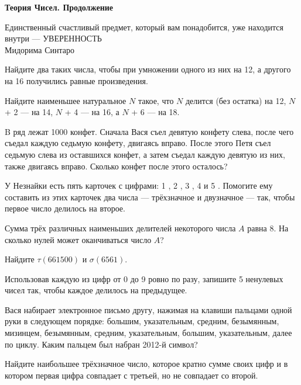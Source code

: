 \centerline{\bf \Huge Теория Чисел. Продолжение}

\begin{flushright}
        \scriptsize{Единственный счастливый предмет, который вам понадобится, уже находится внутри — УВЕРЕННОСТЬ\\ Мидорима Синтаро}
\end{flushright}

 Найдите два таких числа, чтобы при умножении одного из них на 12, а другого на 16 получились равные произведения.

 Найдите наименьшее натуральное $N$
такое, что $N$ делится (без остатка) на 12, $N$ + 2 — на 14, $N$ + 4 — на 16, а $N$ + 6 — на 18.

 B ряд лежат 1000 конфет. Сначала Вася съел
девятую конфету слева, после чего съедал каждую седьмую конфету, двигаясь вправо. После
этого Петя съел седьмую слева из оставшихся конфет, а затем съедал каждую девятую из них,
также двигаясь вправо. Сколько конфет после этого осталось?

 У Незнайки есть пять карточек с цифрами: 1 , 2 ,
3 , 4 и 5 . Помогите ему составить из этих карточек два числа — трёхзначное и двузначное —
так, чтобы первое число делилось на второе.

  Сумма трёх различных наименьших делителей
некоторого числа $A$ равна 8. На сколько нулей может оканчиваться число $A$?

 Найдите $\tau(661500)$ и $\sigma(6561). $

 Использовав каждую из цифр от 0 до 9 ровно по
разу, запишите 5 ненулевых чисел так, чтобы каждое делилось на предыдущее.

 Вася набирает электронное письмо другу, нажимая на клавиши
пальцами одной руки в следующем порядке: большим, указательным, средним, безымянным,
мизинцем, безымянным, средним, указательным, большим, указательным, далее по циклу. Каким пальцем был набран 2012-й символ?

 Найдите наибольшее трёхзначное число, которое
кратно сумме своих цифр и в котором первая цифра совпадает с третьей, но не совпадает со
второй.
